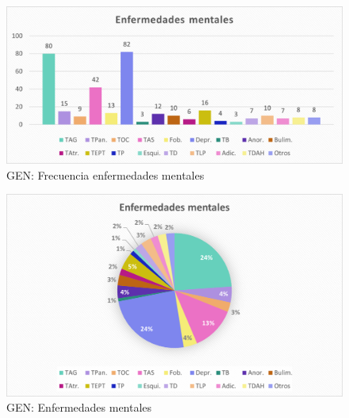 \documentclass[12pt, a4paper,twoside,titlepage]{book}
\begin{document}
\begin{figure}
	\centering
	\includegraphics[width=.8\linewidth]{ANEXO Gen/23AnexGENEnf}
	\caption{GEN: Frecuencia enfermedades mentales}
	\label{fig:GENFrecenf}
\end{figure}
\begin{figure}
	\centering
	\includegraphics[width=.8\linewidth]{ANEXO Gen/24AnexGENEnf}
	\caption{GEN: Enfermedades mentales}
	\label{fig:GENFrecenfpoc}
\end{figure}
\end{document}
